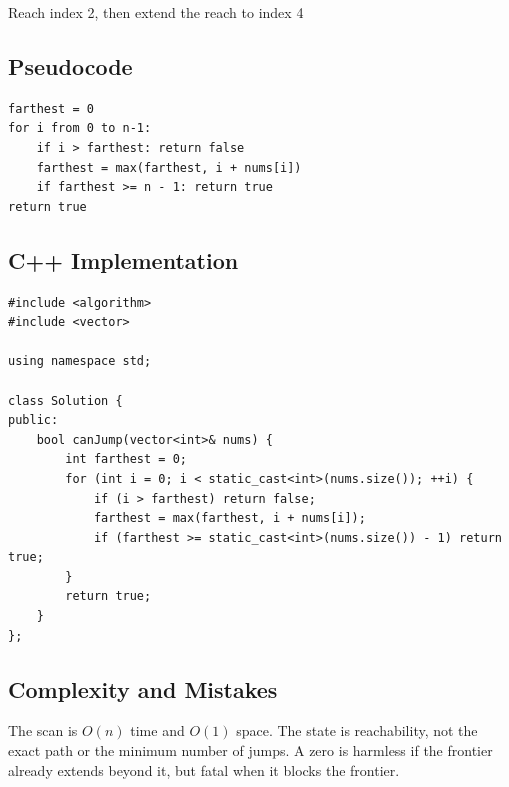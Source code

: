 \begin{visualbox}{Reach index 2, then extend the reach to index 4}
\centering
{}
\end{visualbox}

\subsection{Pseudocode}
\begin{lstlisting}[style=pseudocode]
farthest = 0
for i from 0 to n-1:
    if i > farthest: return false
    farthest = max(farthest, i + nums[i])
    if farthest >= n - 1: return true
return true
\end{lstlisting}

\subsection{C++ Implementation}
\begin{lstlisting}[style=compactcode,caption={Complete C++ solution: Jump Game}]
#include <algorithm>
#include <vector>

using namespace std;

class Solution {
public:
    bool canJump(vector<int>& nums) {
        int farthest = 0;
        for (int i = 0; i < static_cast<int>(nums.size()); ++i) {
            if (i > farthest) return false;
            farthest = max(farthest, i + nums[i]);
            if (farthest >= static_cast<int>(nums.size()) - 1) return true;
        }
        return true;
    }
};
\end{lstlisting}

\subsection{Complexity and Mistakes}
The scan is \(O(n)\) time and \(O(1)\) space. The state is reachability, not
the exact path or the minimum number of jumps. A zero is harmless if the
frontier already extends beyond it, but fatal when it blocks the frontier.

